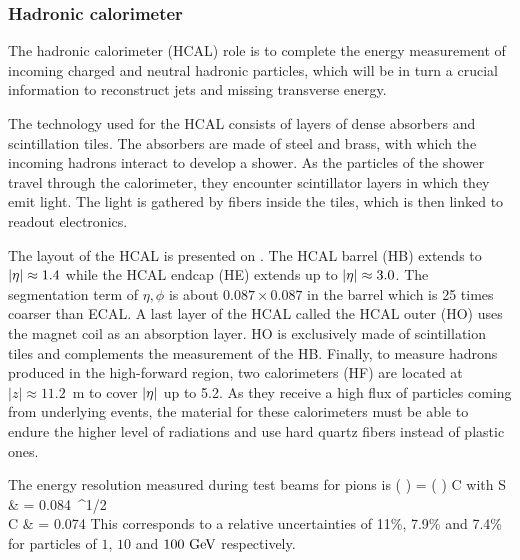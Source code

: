         \subsubsection{Hadronic calorimeter}

    The hadronic calorimeter (HCAL) role is to complete the energy measurement
    of incoming charged and neutral hadronic particles, which will be in turn a
    crucial information to reconstruct jets and missing transverse energy.

    The technology used for the HCAL consists of layers of dense absorbers and
    scintillation tiles. The absorbers are made of steel and brass, with which
    the incoming hadrons interact to develop a shower. As the particles of the
    shower travel through the calorimeter, they encounter scintillator layers in
    which they emit light. The light is gathered by fibers inside the tiles,
    which is then linked to readout electronics.


    The layout of the HCAL is presented on . The HCAL
    barrel (HB) extends to $\left| \eta \right| \approx 1.4$ while the HCAL endcap (HE)
    extends up to $\left| \eta \right| \approx 3.0$. The segmentation term of $\eta,\phi$ is
    about $0.087 \times 0.087$ in the barrel which is 25 times coarser than
    ECAL. A last layer of the HCAL called the HCAL outer (HO) uses the magnet
    coil as an absorption layer. HO is exclusively made of scintillation tiles
    and complements the measurement of the HB. Finally, to measure hadrons
    produced in the high-forward region, two calorimeters (HF) are located at
    $\left|z\right| \approx 11.2$~m to cover $\left| \eta \right|$ up to 5.2. As they
    receive a high flux of particles coming from underlying events, the material
    for these calorimeters must be able to endure the higher level of radiations
    and use hard quartz fibers instead of plastic ones.

    The energy resolution measured during test beams for pions is
    {
        \left(  \right)
        =
        \left(  \right)
        \oplus
        C
    }
    with
    {
        S & = 0.084~^{1/2} \\
        C & = 0.074\nonumber
    }
    This corresponds to a relative uncertainties of 11\%, 7.9\% and 7.4\% for
    particles of $1$, $10$ and $100~\text{GeV}$ respectively.

